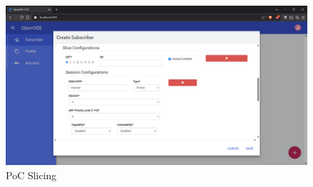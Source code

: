 \begin{figure}[H]
    \includegraphics[width=\linewidth]{../graphics/POC-Slicing.png}
    \caption{PoC Slicing}
    \label{fig:pocSlicing}
\end{figure}

\section{}%
\label{sec:integrations}%


